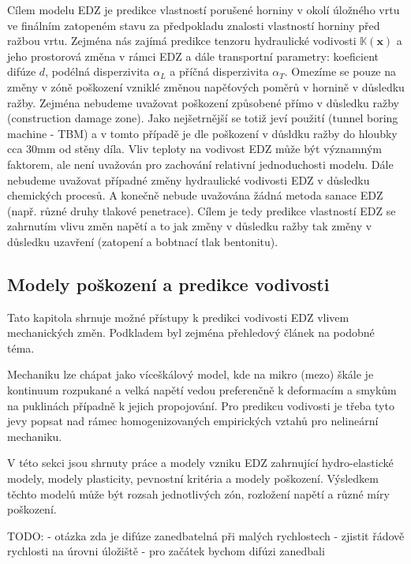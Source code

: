 \documentclass{article}
\def\vc#1{\mathbf{\boldsymbol{#1}}}     %
\def\tn#1{{\mathbb{#1}}}    %
\begin{document}
Cílem modelu EDZ je predikce vlastností porušené horniny v okolí úložného vrtu ve finálním 
zatopeném stavu za předpokladu znalosti vlastností horniny před ražbou vrtu. 
Zejména nás zajímá predikce tenzoru hydraulické vodivosti $\tn K(\vc x)$ 
a jeho prostorová změna v rámci EDZ a dále transportní parametry: 
koeficient difúze $d$, podélná disperzivita $\alpha_L$ a příčná disperzivita $\alpha_T$. 
Omezíme se pouze na změny v zóně poškození vzniklé změnou napěťových poměrů v hornině 
v důsledku ražby. Zejména nebudeme uvažovat poškození způsobené přímo v důsledku ražby 
(construction damage zone).
Jako nejšetrnější se totiž jeví použití (tunnel boring machine - TBM) 
a v tomto případě je dle \cite{Vavro2016} poškození v důsldku ražby 
do hloubky cca 30mm od stěny díla. 
Vliv teploty na vodivost EDZ může být významným faktorem, ale není uvažován pro zachování 
relativní jednoduchosti modelu. Dále nebudeme uvažovat případné změny hydraulické vodivosti 
EDZ v důsledku chemických procesů. A konečně nebude uvažována žádná metoda sanace EDZ 
(např. různé druhy tlakové penetrace). Cílem je tedy predikce vlastností EDZ se 
zahrnutím vlivu změn napětí a to jak změny v důsledku ražby tak změny v důsledku uzavření 
(zatopení a bobtnací tlak bentonitu).

\subsection{Modely poškození a predikce vodivosti}
Tato kapitola shrnuje možné přístupy k predikci vodivosti EDZ vlivem mechanických změn. Podkladem byl zejména přehledový článek \cite{Shahbazi2020a} na podobné téma. 

Mechaniku lze chápat jako víceškálový model, kde na mikro (mezo) škále je kontinuum rozpukané a velká napětí vedou preferenčně k deformacím a smykům na puklinách případně k jejich propojování. Pro predikcu vodivosti je třeba tyto jevy popsat nad rámec homogenizovaných empirických vztahů pro nelineární mechaniku.






V této sekci jsou shrnuty práce a modely vzniku EDZ zahrnující hydro-elastické modely, modely plasticity, pevnostní kritéria a modely poškození. Výsledkem těchto modelů může být rozsah jednotlivých zón, rozložení napětí a různé míry poškození.



TODO:
- otázka zda je difúze zanedbatelná při malých rychlostech
- zjistit řádově rychlosti na úrovni úložiště
- pro začátek bychom difúzi zanedbali
\end{document}
